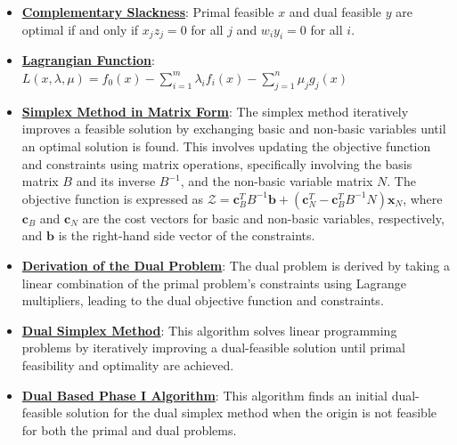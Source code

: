 \documentclass{article}%
\begin{document}
\begin{itemize}[leftmargin=*]
\item \href{https://www.math.purdue.edu/~yipn/421//2024-09-12-Duality.pdf#page=21}{\textbf{Complementary Slackness}}: Primal feasible $x$ and dual feasible $y$ are optimal if and only if $x_j z_j = 0$ for all $j$ and $w_i y_i = 0$ for all $i$.%
\item \href{https://www.math.purdue.edu/~yipn/421//2024-09-17-DualityGeneral.pdf#page=7}{\textbf{Lagrangian Function}}: $L(x,\lambda,\mu) = f_0(x) - \sum_{i=1}^m \lambda_i f_i(x) - \sum_{j=1}^n \mu_j g_j(x)$%
\item \href{https://www.math.purdue.edu/~yipn/421//2024-09-24-SimplexMatrix.pdf#page=8}{\textbf{Simplex Method in Matrix Form}}: The simplex method iteratively improves a feasible solution by exchanging basic and non-basic variables until an optimal solution is found.  This involves updating the objective function and constraints using matrix operations, specifically involving the basis matrix $B$ and its inverse $B^{-1}$, and the non-basic variable matrix $N$.  The objective function is expressed as $\mathcal{Z} = \mathbf{c}_B^T B^{-1} \mathbf{b} + (\mathbf{c}_N^T - \mathbf{c}_B^T B^{-1} N) \mathbf{x}_N$, where $\mathbf{c}_B$ and $\mathbf{c}_N$ are the cost vectors for basic and non-basic variables, respectively, and $\mathbf{b}$ is the right-hand side vector of the constraints.%
\item \href{https://www.math.purdue.edu/~yipn/421//2024-10-01-DualGeneralLP.pdf#page=1}{\textbf{Derivation of the Dual Problem}}: The dual problem is derived by taking a linear combination of the primal problem's constraints using Lagrange multipliers, leading to the dual objective function and constraints.%
\item \href{https://www.math.purdue.edu/~yipn/421//2024-10-03-DualSimplexMatrix.pdf#page=2}{\textbf{Dual Simplex Method}}: This algorithm solves linear programming problems by iteratively improving a dual-feasible solution until primal feasibility and optimality are achieved.%
\item \href{https://www.math.purdue.edu/~yipn/421//2024-10-03-DualSimplexMatrix.pdf#page=5}{\textbf{Dual Based Phase I Algorithm}}: This algorithm finds an initial dual-feasible solution for the dual simplex method when the origin is not feasible for both the primal and dual problems.%
\end{itemize}

%
\end{document}
